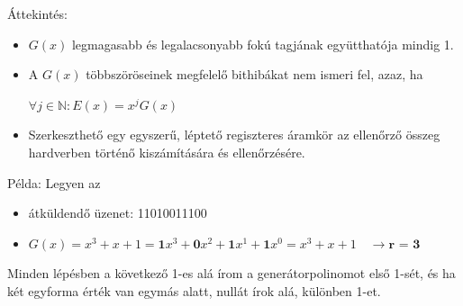 \documentclass[12pt]{article}
\begin{document}
    \noindent Áttekintés:
    \begin{itemize}[leftmargin=7.5mm]
        \renewcommand{\labelitemi}{$\vcenter{\hbox{\tiny$\bullet$}}$}
        \item $G(x)$ legmagasabb és legalacsonyabb fokú tagjának együtthatója mindig 1.
        \item A $G(x)$ többszöröseinek megfelelő bithibákat nem ismeri fel, azaz, ha
        \begin{center}
            $\forall j \in \mathbb{N}: E(x) = x^jG(x)$
        \end{center}
        \item Szerkeszthető egy egyszerű, léptető regiszteres áramkör az ellenőrző összeg hardverben történő kiszámítására és ellenőrzésére.
    \end{itemize}
    \newpage

    \noindent Példa: Legyen az
    \begin{itemize}[leftmargin=7.5mm]
        \renewcommand{\labelitemi}{$\vcenter{\hbox{\tiny$\bullet$}}$}
        \item átküldendő üzenet: 11010011100
        \item $G(x) = x^3 + x + 1 = \textbf{1} x^3 + \textbf{0} x^2 + \textbf{1} x^1 + \textbf{1} x^0 = x^3 + x + 1 \quad \rightarrow \textbf{r = 3}$
    \end{itemize}

    \noindent Minden lépésben a következő 1-es alá írom a generátorpolinomot első 1-sét, és ha két egyforma érték van egymás alatt, nullát írok alá, különben 1-et.    \\
\end{document}
